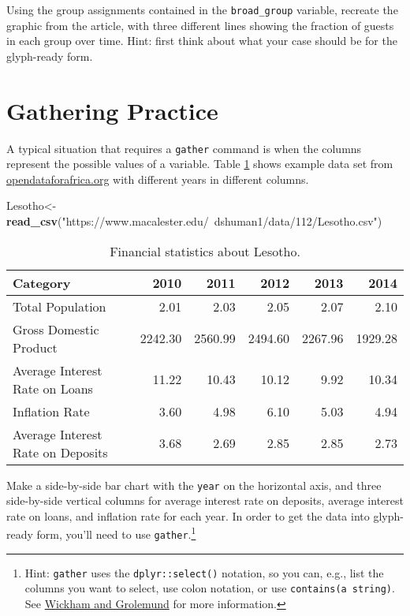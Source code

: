 \documentclass[]{tufte-handout}
\newenvironment{Shaded}{}{}
\newcommand{\KeywordTok}[1]{\textcolor[rgb]{0.00,0.44,0.13}{\textbf{{#1}}}}
\newcommand{\StringTok}[1]{\textcolor[rgb]{0.25,0.44,0.63}{{#1}}}
\newcommand{\NormalTok}[1]{{#1}}
\theoremstyle{definition}
\theoremstyle{definition}
\theoremstyle{definition}
\theoremstyle{remark}
\let\BeginKnitrBlock\begin \let\EndKnitrBlock\end
\begin{document}
\BeginKnitrBlock{exercise}
\protect\hypertarget{exr:unnamed-chunk-19}{}{\label{exr:unnamed-chunk-19}
}Using the group assignments contained in the \texttt{broad\_group}
variable, recreate the graphic from the article, with three different
lines showing the fraction of guests in each group over time. Hint:
first think about what your case should be for the glyph-ready form.
\EndKnitrBlock{exercise}

\section{Gathering Practice}\label{gathering-practice}

A typical situation that requires a \texttt{gather} command is when the
columns represent the possible values of a variable. Table
\ref{tab:lesotho-table} shows example data set from
\href{http://dataportal.opendataforafrica.org/}{opendataforafrica.org}
with different years in different columns.

\begin{Shaded}
\begin{Highlighting}[]
\NormalTok{Lesotho<-}\KeywordTok{read_csv}\NormalTok{(}\StringTok{"https://www.macalester.edu/~dshuman1/data/112/Lesotho.csv"}\NormalTok{)}
\end{Highlighting}
\end{Shaded}

\begin{table}

\caption{\label{tab:lesotho-table}Financial statistics about Lesotho.}
\centering
\begin{tabular}[t]{l|r|r|r|r|r}
\hline
Category & 2010 & 2011 & 2012 & 2013 & 2014\\
\hline
Total Population & 2.01 & 2.03 & 2.05 & 2.07 & 2.10\\
\hline
Gross Domestic Product & 2242.30 & 2560.99 & 2494.60 & 2267.96 & 1929.28\\
\hline
Average Interest Rate on Loans & 11.22 & 10.43 & 10.12 & 9.92 & 10.34\\
\hline
Inflation Rate & 3.60 & 4.98 & 6.10 & 5.03 & 4.94\\
\hline
Average Interest Rate on Deposits & 3.68 & 2.69 & 2.85 & 2.85 & 2.73\\
\hline
\end{tabular}
\end{table}

\BeginKnitrBlock{exercise}[Gathering practice]
\protect\hypertarget{exr:unnamed-chunk-21}{}{\label{exr:unnamed-chunk-21}
\iffalse (Gathering practice) \fi{} }Make a side-by-side bar chart with
the \texttt{year} on the horizontal axis, and three side-by-side
vertical columns for average interest rate on deposits, average interest
rate on loans, and inflation rate for each year. In order to get the
data into glyph-ready form, you'll need to use
\texttt{gather}.\footnote{Hint: \texttt{gather} uses the
  \texttt{dplyr::select()} notation, so you can, e.g., list the columns
  you want to select, use colon notation, or use
  \texttt{contains(a\ string)}. See
  \href{http://r4ds.had.co.nz/transform.html\#select-columns-with-select}{Wickham
  and Grolemund} for more information.}
\EndKnitrBlock{exercise}
\end{document}
